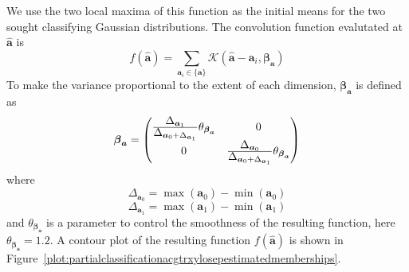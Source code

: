 We use the two local maxima of this function as the initial means for the two
sought classifying Gaussian distributions. The convolution function evalutated
at $\boldsymbol{\hat{a}}$ is
\[
    f(\boldsymbol{\hat{a}}) = \sum_{\boldsymbol{a}_i \in \{\boldsymbol{a}\}}
    \mathscr{K} \left( \boldsymbol{\hat{a}} - \boldsymbol{a}_i,
    \boldsymbol{\beta}_{\boldsymbol{a}} \right)
\]
To make the variance proportional to the extent of each dimension,
$\boldsymbol{\beta}_{\boldsymbol{a}}$ is defined as
\[
    \boldsymbol{\beta}_{\boldsymbol{a}}
    =
    \begin{pmatrix}
        \frac{\displaystyle\Delta_{\boldsymbol{a}_1}}{\displaystyle\Delta_{\boldsymbol{a}_0
        +\Delta_{\boldsymbol{a}_1}}}
            \theta_{\boldsymbol{\beta}_{\boldsymbol{a}}}
        & 0 \\
        0 & \frac{\displaystyle\Delta_{\boldsymbol{a}_0}}{\displaystyle\Delta_{\boldsymbol{a}_0
    +\Delta_{\boldsymbol{a}_1}}}
            \theta_{\boldsymbol{\beta}_{\boldsymbol{a}}}
    \end{pmatrix}
\]
where
\[
    \Delta_{\boldsymbol{a}_0} = \max \left( \boldsymbol{a}_0 \right)
        - \min \left( \boldsymbol{a}_0 \right)
\]
\[
    \Delta_{\boldsymbol{a}_1} = \max \left( \boldsymbol{a}_1 \right)
        - \min \left( \boldsymbol{a}_1 \right)
\]
and $\theta_{\boldsymbol{\beta}_{\boldsymbol{a}}}$ is a parameter to control
the smoothness of the resulting function, here
$\theta_{\boldsymbol{\beta}_{\boldsymbol{a}}} = 1.2$. A contour plot of the
resulting function $f(\boldsymbol{\hat{a}})$ is shown in
Figure~\ref{plot:partialclassificationacgtrxylosepestimatedmemberships}.

